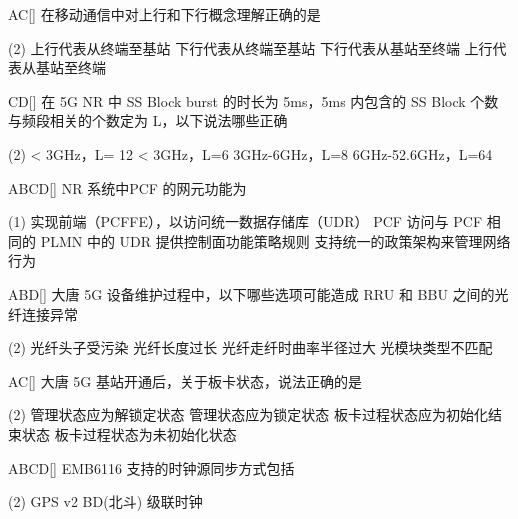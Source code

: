 \begin{choice}{\;AC\;}[]
    在移动通信中对上行和下行概念理解正确的是
    \begin{tasks}(2)
        \task 上行代表从终端至基站
        \task 下行代表从终端至基站
        \task 下行代表从基站至终端
        \task 上行代表从基站至终端
    \end{tasks}
\end{choice}



\begin{choice}{\;CD\;}[]
    在 5G NR 中 SS Block burst 的时长为 5ms，5ms 内包含的 SS Block 个数与频段相关的个数定为 L，以下说法哪些正确
    \begin{tasks}(2)
        \task < 3GHz，L= 12
        \task < 3GHz，L=6
        \task 3GHz-6GHz，L=8
        \task 6GHz-52.6GHz，L=64
    \end{tasks}
\end{choice}

\begin{choice}{\;ABCD\;}[]
    NR 系统中PCF 的网元功能为
    \begin{tasks}(1)
        \task 实现前端（PCFFE），以访问统一数据存储库（UDR）
        \task PCF 访问与 PCF 相同的 PLMN 中的 UDR
        \task 提供控制面功能策略规则
        \task 支持统一的政策架构来管理网络行为
    \end{tasks}
\end{choice}


\begin{choice}{\;ABD\;}[]
    大唐 5G 设备维护过程中，以下哪些选项可能造成 RRU 和 BBU 之间的光纤连接异常
    \begin{tasks}(2)
        \task 光纤头子受污染
        \task 光纤长度过长
        \task 光纤走纤时曲率半径过大
        \task 光模块类型不匹配
    \end{tasks}
\end{choice}


\begin{choice}{\;AC\;}[]
    大唐 5G 基站开通后，关于板卡状态，说法正确的是
    \begin{tasks}(2)
        \task 管理状态应为解锁定状态
        \task 管理状态应为锁定状态
        \task 板卡过程状态应为初始化结束状态
        \task 板卡过程状态为未初始化状态
    \end{tasks}
\end{choice}


\begin{choice}{\;ABCD\;}[]
    EMB6116 支持的时钟源同步方式包括
    \begin{tasks}(2)
        \task GPS
         v2
        \task BD(北斗)
        \task 级联时钟
    \end{tasks}
\end{choice}


